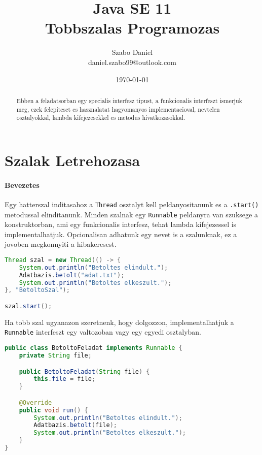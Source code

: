 \documentclass{article}
\title{%
Java SE 11 \\
\large Tobbszalas Programozas}
\author{Szabo Daniel\\daniel.szabo99@outlook.com}
\date{\today}
\let\l\lstinline
\begin{document}
\maketitle
\begin{abstract}
Ebben a feladatsorban egy specialis interfesz tipust, a funkcionalis interfeszt ismerjuk meg, ezek felepiteset es hasznalatat hagyomanyos implementacioval, nevtelen osztalyokkal, lambda kifejezesekkel es metodus hivatkozasokkal.
\end{abstract}

\newpage

\tableofcontents{}

\newpage

\section{Szalak Letrehozasa}
\paragraph{Bevezetes}

Egy hatterszal inditasahoz a \l{Thread} osztalyt kell peldanyositanunk es a \l{.start()} metodussal elinditanunk. Minden szalnak egy \l{Runnable} peldanyra van szuksege a konstruktorban, ami egy funkcionalis interfesz, tehat lambda kifejezessel is implementalhatjuk. Opcionalisan adhatunk egy nevet is a szalunknak, ez a jovoben megkonnyiti a hibakeresest.

\begin{lstlisting}[language=Java, caption=Uj szal inditasa]
Thread szal = new Thread(() -> {
	System.out.println("Betoltes elindult.");
	Adatbazis.betolt("adat.txt");
	System.out.println("Betoltes elkeszult.");
}, "BetoltoSzal");

szal.start();
\end{lstlisting}

Ha tobb szal ugyanazon szeretnenk, hogy dolgozzon, implementalhatjuk a \l{Runnable} interfeszt egy valtozoban vagy egy egyedi osztalyban.

\begin{lstlisting}[language=Java, caption=Uj szal inditasa]
public class BetoltoFeladat implements Runnable {
	private String file;

	public BetoltoFeladat(String file) {
		this.file = file;
	}

	@Override
	public void run() {
		System.out.println("Betoltes elindult.");
		Adatbazis.betolt(file);
		System.out.println("Betoltes elkeszult.");
	}
}
\end{lstlisting}
\end{document}
